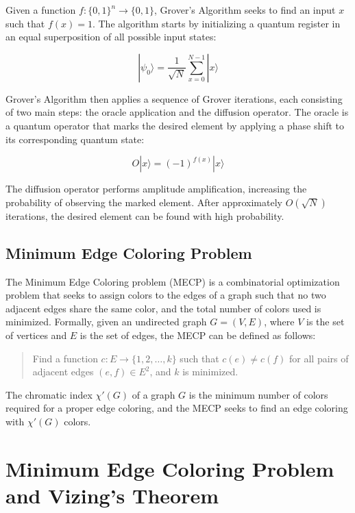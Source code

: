 Given a function $f: \{0, 1\}^n \rightarrow \{0, 1\}$, Grover's Algorithm seeks to find an input $x$ such that $f(x) = 1$. The algorithm starts by initializing a quantum register in an equal superposition of all possible input states:

\begin{equation}
    |\psi_0\rangle = \frac{1}{\sqrt{N}} \sum_{x=0}^{N-1} |x\rangle
\end{equation}

Grover's Algorithm then applies a sequence of Grover iterations, each consisting of two main steps: the oracle application and the diffusion operator. The oracle is a quantum operator that marks the desired element by applying a phase shift to its corresponding quantum state:

\begin{equation}
    O|x\rangle = (-1)^{f(x)}|x\rangle
\end{equation}

The diffusion operator performs amplitude amplification, increasing the probability of observing the marked element. After approximately $O(\sqrt{N})$ iterations, the desired element can be found with high probability.

\subsection{Minimum Edge Coloring Problem}

The Minimum Edge Coloring problem (MECP) is a combinatorial optimization problem that seeks to assign colors to the edges of a graph such that no two adjacent edges share the same color, and the total number of colors used is minimized. Formally, given an undirected graph $G = (V, E)$, where $V$ is the set of vertices and $E$ is the set of edges, the MECP can be defined as follows:

\begin{quote}
    Find a function $c: E \rightarrow \{1, 2, \ldots, k\}$ such that $c(e) \neq c(f)$ for all pairs of adjacent edges $(e, f) \in E^2$, and $k$ is minimized.
\end{quote}

The chromatic index $\chi'(G)$ of a graph $G$ is the minimum number of colors required for a proper edge coloring, and the MECP seeks to find an edge coloring with $\chi'(G)$ colors.

\section{Minimum Edge Coloring Problem and Vizing's Theorem}

